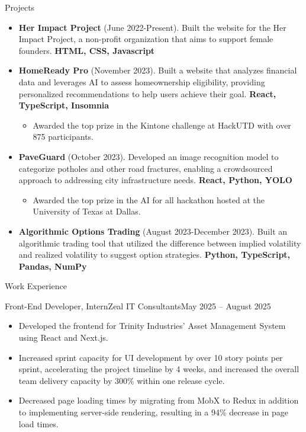 \documentclass[]{mcdowellcv}
\begin{document}
	\begin{cvsection}{Projects}
		\begin{cvsubsection}{}{}{}	
			\begin{itemize}
				\item \textbf{Her Impact Project} (June 2022-Present).  Built the website for the Her Impact Project, a non-profit organization that aims to support female founders. \textbf{HTML, CSS, Javascript}
				\item \textbf{HomeReady Pro} (November 2023). Built a website that analyzes financial data and leverages AI to assess homeownership eligibility, providing personalized recommendations to help users achieve their goal. \textbf{React, TypeScript, Insomnia}
				\begin{itemize}
				\item Awarded the top prize in the Kintone challenge at HackUTD with over 875 participants.
				\end{itemize}
				\item \textbf{PaveGuard} (October 2023). Developed an image recognition model to categorize potholes and other road fractures, enabling a crowdsourced approach to addressing city infrastructure needs. \textbf{React, Python, YOLO}
				\begin{itemize}
					\item Awarded the top prize in the AI for all hackathon hosted at the University of Texas at Dallas.
				\end{itemize}
				\item \textbf{Algorithmic Options Trading} (August 2023-December 2023). Built an algorithmic trading tool that utilized the difference between implied volatility and realized volatility to suggest option strategies. \textbf{Python, TypeScript, Pandas, NumPy}
			\end{itemize}
		\end{cvsubsection}
	\end{cvsection}
		\begin{cvsection}{Work Experience}
		\begin{cvsubsection}{Front-End Developer, Intern}{Zeal IT Consultants}{May 2025 -- August 2025}			
			\begin{itemize}
				\item Developed the frontend for Trinity Industries' Asset Management System using React and Next.js.
				\item Increased sprint capacity for UI development by over 10 story points per sprint, accelerating the project timeline by 4 weeks, and increased the overall team delivery capacity by 300\% within one release cycle.
				\item Decreased page loading times by migrating from MobX to Redux in addition to implementing server-side rendering, resulting in a 94\% decrease in page load times.
			\end{itemize}
		\end{cvsubsection}
	\end{cvsection}
\end{document}

